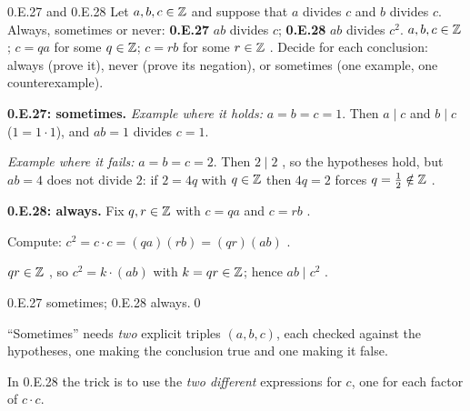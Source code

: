 \begin{bookex}[essential]{0.E.27 and 0.E.28}
Let $a,b,c\in\mathbb{Z}$ and suppose that $a$ divides $c$ and $b$ divides $c$. Always, sometimes or never: \textbf{0.E.27} $ab$ divides $c$; \textbf{0.E.28} $ab$ divides $c^2$.
\solution
\given $a,b,c\in\mathbb{Z}$; $c=qa$ for some $q\in\mathbb{Z}$; $c=rb$ for some $r\in\mathbb{Z}$ .
\goal Decide for each conclusion: always (prove it), never (prove its negation), or sometimes (one example, one counterexample).
\begin{steps}
\item \textbf{0.E.27: sometimes.} \emph{Example where it holds:} $a=b=c=1$. Then $a\mid c$ and $b\mid c$ ($1=1\cdot1$), and $ab=1$ divides $c=1$.
\item \emph{Example where it fails:} $a=b=c=2$. Then $2\mid2$ , so the hypotheses hold, but $ab=4$ does not divide $2$: if $2=4q$ with $q\in\mathbb{Z}$ then $4q=2$ forces $q=\frac12\notin\mathbb{Z}$ .
\item \textbf{0.E.28: always.} Fix $q,r\in\mathbb{Z}$ with $c=qa$ and $c=rb$ .
\item Compute: $c^2=c\cdot c=(qa)(rb)=(qr)(ab)$ .
\item $qr\in\mathbb{Z}$ , so $c^2=k\cdot(ab)$ with $k=qr\in\mathbb{Z}$; hence $ab\mid c^2$ .
\end{steps}
\conclusion 0.E.27 sometimes; 0.E.28 always.\qed
\begin{compare}
\item ``Sometimes'' needs \emph{two} explicit triples $(a,b,c)$, each checked against the hypotheses, one making the conclusion true and one making it false.
\item In 0.E.28 the trick is to use the \emph{two different} expressions for $c$, one for each factor of $c\cdot c$.
\end{compare}
\end{bookex}

